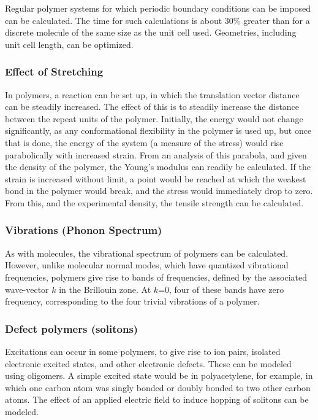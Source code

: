 Regular polymer  systems for which periodic boundary conditions can be
imposed can be calculated.  The time for such calculations is about 30\%
greater than for a discrete molecule of the same size as the unit cell used.
Geometries, including unit cell length, can be optimized.

\subsubsection*{Effect of Stretching}

In polymers, a reaction can be set up, in which the translation vector
distance  can be steadily increased.  The effect of this is to steadily
increase the distance  between the repeat units of the polymer.  Initially, the
energy would not change  significantly, as any conformational flexibility in
the polymer is used up, but  once that is done, the energy of the system (a
measure of the stress) would rise  parabolically with increased strain.  From
an analysis of this parabola, and given  the density of the polymer, the
Young's modulus can readily be calculated.  If  the strain is increased without
limit, a point would be reached at which the  weakest bond in the polymer would
break, and the stress would immediately  drop to zero.  From this, and the
experimental density, the tensile strength can be  calculated.

\subsubsection*{Vibrations (Phonon Spectrum)}

As with molecules, the vibrational spectrum of polymers can be calculated.
However, unlike molecular normal modes, which have quantized vibrational
frequencies, polymers give rise to bands of frequencies, defined by the
associated wave-vector $k$ in the Brillouin zone. At $k$=0, four of these bands have
zero frequency, corresponding to the four trivial vibrations of a polymer.

\subsubsection*{Defect polymers (solitons)}

Excitations can occur in some polymers, to give rise to ion pairs, isolated
electronic excited states, and other electronic defects.  These can be modeled
using oligomers.  A simple excited state would be in polyacetylene, for
example, in which one carbon atom was singly bonded or doubly bonded to two
other carbon atoms.  The effect of an applied electric field to induce hopping
of solitons can be modeled.

